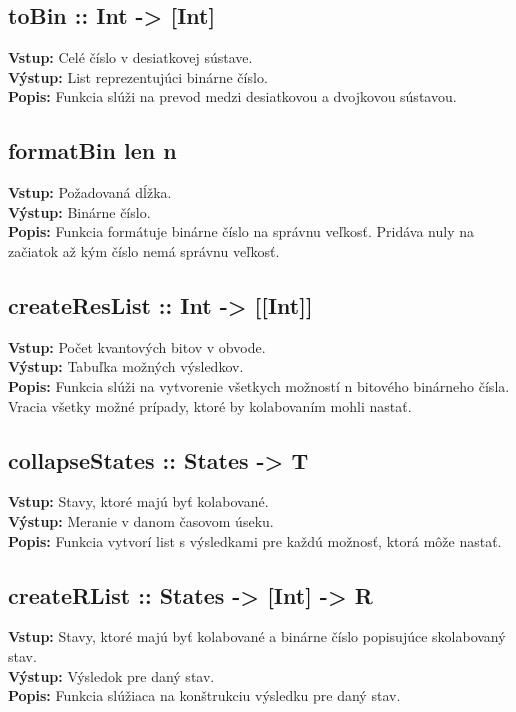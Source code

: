 \subsection*{toBin :: Int -> [Int]}
\textbf{Vstup:} Celé číslo v desiatkovej sústave.\\
\textbf{Výstup:} List reprezentujúci binárne číslo.\\
\textbf{Popis:} Funkcia slúži na prevod medzi desiatkovou a dvojkovou 
sústavou.

\subsection*{formatBin len n}
\textbf{Vstup:} Požadovaná dĺžka. \\
\textbf{Výstup:} Binárne číslo.\\
\textbf{Popis:} Funkcia formátuje binárne číslo na správnu veľkosť. Pridáva
nuly na začiatok až kým číslo nemá správnu veľkosť.

\subsection*{createResList :: Int -> [[Int]]}
\textbf{Vstup:} Počet kvantových bitov v obvode.\\
\textbf{Výstup:} Tabuľka možných výsledkov.\\
\textbf{Popis:} Funkcia slúži na vytvorenie všetkych možností n bitového 
binárneho čísla. Vracia všetky možné prípady, ktoré by kolabovaním mohli
nastať.

\subsection*{collapseStates :: States -> T}
\textbf{Vstup:} Stavy, ktoré majú byť kolabované.\\
\textbf{Výstup:} Meranie v danom časovom úseku.\\
\textbf{Popis:} Funkcia vytvorí list s výsledkami pre každú možnosť, ktorá
môže nastať.

\subsection*{createRList :: States -> [Int] -> R}
\textbf{Vstup:} Stavy, ktoré majú byť kolabované a binárne číslo popisujúce
skolabovaný stav.\\
\textbf{Výstup:} Výsledok pre daný stav.\\
\textbf{Popis:} Funkcia slúžiaca na konštrukciu výsledku pre daný stav.

